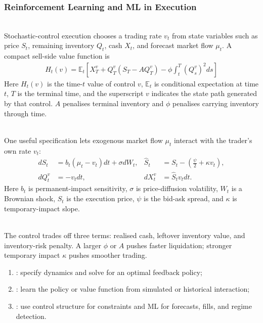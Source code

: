 \subsubsection{Reinforcement Learning and ML in Execution}

\begin{model} \\
Stochastic-control execution chooses a trading rate $v_t$ from state variables such as price $S_t$, remaining inventory $Q_t$, cash $X_t$, and forecast market flow $\mu_t$. A compact sell-side value function is
\begin{align*}
H_t(v)=\mathbb{E}_t\left[X_T^v+Q_T^v(S_T-AQ_T^v)-\phi\int_t^T(Q_s^v)^2ds\right]
\end{align*}
Here $H_t(v)$ is the time-$t$ value of control $v$, $\mathbb{E}_t$ is conditional expectation at time $t$, $T$ is the terminal time, and the superscript $v$ indicates the state path generated by that control. $A$ penalises terminal inventory and $\phi$ penalises carrying inventory through time.
\end{model}

\begin{model} \\
One useful specification lets exogenous market flow $\mu_t$ interact with the trader's own rate $v_t$:
\begin{align*}
dS_t&=b_t(\mu_t-v_t)dt+\sigma dW_t, & \widehat{S}_t&=S_t-\left(\frac{\psi}{2}+\kappa v_t\right),\\
dQ_t^v&=-v_tdt, & dX_t^v&=\widehat{S}_t v_tdt.
\end{align*}
Here $b_t$ is permanent-impact sensitivity, $\sigma$ is price-diffusion volatility, $W_t$ is a Brownian shock, $\widehat{S}_t$ is the execution price, $\psi$ is the bid-ask spread, and $\kappa$ is temporary-impact slope.
\end{model}

\begin{principle} \\
The control trades off three terms: realised cash, leftover inventory value, and inventory-risk penalty. A larger $\phi$ or $A$ pushes faster liquidation; stronger temporary impact $\kappa$ pushes smoother trading.
\end{principle}

\begin{taxonomy} 
\begin{enumerate}[label=\roman*.]
\setlength{\itemsep}{0pt}
\item {}: specify dynamics and solve for an optimal feedback policy;
\item {}: learn the policy or value function from simulated or historical interaction;
\item {}: use control structure for constraints and ML for forecasts, fills, and regime detection.
\end{enumerate}
\end{taxonomy}
